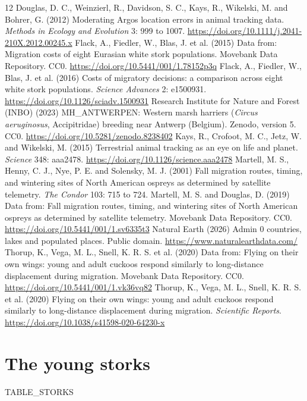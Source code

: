 \documentclass[11pt,a4paper]{article}
\begin{document}
\begin{thebibliography}{12}
 Douglas, D. C., Weinzierl, R., Davidson, S. C., Kays, R., Wikelski, M. and Bohrer, G. (2012) Moderating Argos location errors in animal tracking data. \textit{Methods in Ecology and Evolution} 3: 999 to 1007. \url{https://doi.org/10.1111/j.2041-210X.2012.00245.x}
 Flack, A., Fiedler, W., Blas, J. et al. (2015) Data from: Migration costs of eight Eurasian white stork populations. Movebank Data Repository. CC0. \url{https://doi.org/10.5441/001/1.78152p3q}
 Flack, A., Fiedler, W., Blas, J. et al. (2016) Costs of migratory decisions: a comparison across eight white stork populations. \textit{Science Advances} 2: e1500931. \url{https://doi.org/10.1126/sciadv.1500931}
 Research Institute for Nature and Forest (INBO) (2023) MH\_ANTWERPEN: Western marsh harriers (\textit{Circus aeruginosus}, Accipitridae) breeding near Antwerp (Belgium). Zenodo, version 5. CC0. \url{https://doi.org/10.5281/zenodo.8238402}
 Kays, R., Crofoot, M. C., Jetz, W. and Wikelski, M. (2015) Terrestrial animal tracking as an eye on life and planet. \textit{Science} 348: aaa2478. \url{https://doi.org/10.1126/science.aaa2478}
 Martell, M. S., Henny, C. J., Nye, P. E. and Solensky, M. J. (2001) Fall migration routes, timing, and wintering sites of North American ospreys as determined by satellite telemetry. \textit{The Condor} 103: 715 to 724.
 Martell, M. S. and Douglas, D. (2019) Data from: Fall migration routes, timing, and wintering sites of North American ospreys as determined by satellite telemetry. Movebank Data Repository. CC0. \url{https://doi.org/10.5441/001/1.sv6335t3}
 Natural Earth (2026) Admin 0 countries, lakes and populated places. Public domain. \url{https://www.naturalearthdata.com/}
 Thorup, K., Vega, M. L., Snell, K. R. S. et al. (2020) Data from: Flying on their own wings: young and adult cuckoos respond similarly to long-distance displacement during migration. Movebank Data Repository. CC0. \url{https://doi.org/10.5441/001/1.vk36vq82}
 Thorup, K., Vega, M. L., Snell, K. R. S. et al. (2020) Flying on their own wings: young and adult cuckoos respond similarly to long-distance displacement during migration. \textit{Scientific Reports}. \url{https://doi.org/10.1038/s41598-020-64230-x}
\end{thebibliography}

\clearpage
\appendix
\section{The young storks}
{{TABLE_STORKS}}
\end{document}
